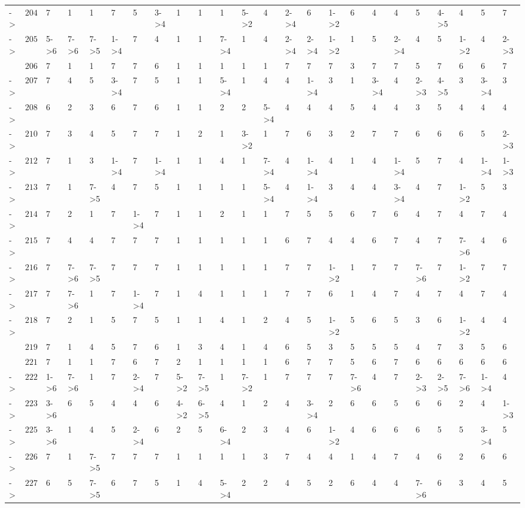 \documentclass[6pt]{article}
\begin{document}
\begin{landscape}
{\begin{longtable}{lrllllllllllllllllllllll}
-\textgreater &$204$&7&1&1&7&5&3-\textgreater 4&1&1&1&5-\textgreater 2&4&2-\textgreater 4&6&1-\textgreater 2&6&4&4&5&4-\textgreater 5&4&5&7\tabularnewline
-\textgreater &$205$&5-\textgreater 6&7-\textgreater 6&7-\textgreater 5&1-\textgreater 4&7&4&1&1&7-\textgreater 4&1&4&2-\textgreater 4&2-\textgreater 4&1-\textgreater 2&1&5&2-\textgreater 4&4&5&1-\textgreater 2&4&2-\textgreater 3\tabularnewline
&$206$&7&1&1&7&7&6&1&1&1&1&1&7&7&7&3&7&7&5&7&6&6&7\tabularnewline
-\textgreater &$207$&7&4&5&3-\textgreater 4&7&5&1&1&5-\textgreater 4&1&4&4&1-\textgreater 4&3&1&3-\textgreater 4&4&2-\textgreater 3&4-\textgreater 5&3&3-\textgreater 4&3\tabularnewline
-\textgreater &$208$&6&2&3&6&7&6&1&1&2&2&5-\textgreater 4&4&4&4&5&4&4&3&5&4&4&4\tabularnewline
-\textgreater &$210$&7&3&4&5&7&7&1&2&1&3-\textgreater 2&1&7&6&3&2&7&7&6&6&6&5&2-\textgreater 3\tabularnewline
-\textgreater &$212$&7&1&3&1-\textgreater 4&7&1-\textgreater 4&1&1&4&1&7-\textgreater 4&4&1-\textgreater 4&4&1&4&1-\textgreater 4&5&7&4&1-\textgreater 4&1-\textgreater 3\tabularnewline
-\textgreater &$213$&7&1&7-\textgreater 5&4&7&5&1&1&1&1&5-\textgreater 4&4&1-\textgreater 4&3&4&4&3-\textgreater 4&4&7&1-\textgreater 2&5&3\tabularnewline
-\textgreater &$214$&7&2&1&7&1-\textgreater 4&7&1&1&2&1&1&7&5&5&6&7&6&4&7&4&7&4\tabularnewline
-\textgreater &$215$&7&4&4&7&7&7&1&1&1&1&1&6&7&4&4&6&7&4&7&7-\textgreater 6&4&6\tabularnewline
-\textgreater &$216$&7&7-\textgreater 6&7-\textgreater 5&7&7&7&1&1&1&1&1&7&7&1-\textgreater 2&1&7&7&7-\textgreater 6&7&1-\textgreater 2&7&7\tabularnewline
-\textgreater &$217$&7&7-\textgreater 6&1&7&1-\textgreater 4&7&1&4&1&1&1&7&7&6&1&4&7&4&7&4&7&4\tabularnewline
-\textgreater &$218$&7&2&1&5&7&5&1&1&4&1&2&4&5&1-\textgreater 2&5&6&5&3&6&1-\textgreater 2&4&4\tabularnewline
&$219$&7&1&4&5&7&6&1&3&4&1&4&6&5&3&5&5&5&4&7&3&5&6\tabularnewline
&$221$&7&1&1&7&6&7&2&1&1&1&1&6&7&7&5&6&7&6&6&6&6&6\tabularnewline
-\textgreater &$222$&1-\textgreater 6&7-\textgreater 6&1&7&2-\textgreater 4&7&5-\textgreater 2&7-\textgreater 5&1&7-\textgreater 2&1&7&7&7&7-\textgreater 6&4&7&2-\textgreater 3&2-\textgreater 5&7-\textgreater 6&1-\textgreater 4&4\tabularnewline
-\textgreater &$223$&3-\textgreater 6&6&5&4&4&6&4-\textgreater 2&6-\textgreater 5&4&1&2&4&3-\textgreater 4&2&6&6&5&6&6&2&4&1-\textgreater 3\tabularnewline
-\textgreater &$225$&3-\textgreater 6&1&4&5&2-\textgreater 4&6&2&5&6-\textgreater 4&2&3&4&6&1-\textgreater 2&4&6&6&6&5&5&3-\textgreater 4&5\tabularnewline
-\textgreater &$226$&7&1&7-\textgreater 5&7&7&7&1&1&1&1&3&7&4&4&1&4&7&4&6&2&6&6\tabularnewline
-\textgreater &$227$&6&5&7-\textgreater 5&6&7&5&1&4&5-\textgreater 4&2&2&4&5&2&6&4&4&7-\textgreater 6&6&3&4&5\tabularnewline

\end{longtable}}
\end{landscape}
\end{document}
